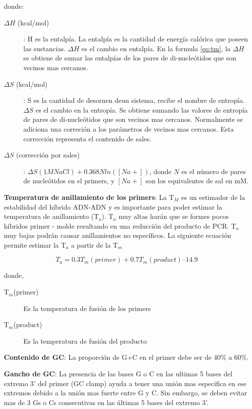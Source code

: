 \documentclass[letter,11pt]{book}
\begin{document}
donde:

\begin{description}
\item[$\Delta H$ (kcal/mol)]: H es la entalpía. La entalpía es la cantidad de energía calórica que poseen las sustancias. $\Delta H$ es el cambio en entalpía. En la formula \ref{eq:tm}, la $\Delta H$ se obtiene de sumar las entalpías de los pares de di-nucleótidos que son vecinos mas cercanos.
\item[$\Delta S$ (kcal/mol)]: S es la cantidad de desornen deun sistema, recibe el nombre de entropía. $\Delta S$ es el cambio en la entropía. Se obtiene sumando las valores de entropía de pares de di-nucleótidos que son vecinos mas cercanos. Normalmente se adiciona una correción a los parámetros de vecinos mas cercanos. Esta corrección representa el contenido de sales.
\item[$\Delta S$ (corrección por sales)]: $ \Delta S (1M NaCl )+ 0.368  N  ln([Na+]) $, donde $N$ es el número de pares de nucleótidos en el primers, y $[Na+]$ son los equivalentes de sal en mM.
\end{description}

\textbf{Temperatura de anillamiento de los primers}: La T$_M$ es un estimador de la estabilidad del híbrido ADN-ADN y es importante para poder estimar la temperatura de anillamiento (T$_a$).  T$_a$ muy altas harán que se formes pocos híbridos primer - molde resultando en una reducción del producto de PCR.  T$_a$ muy bajas podrán causar anillamientos no específicos. La siguiente ecuación permite estimar la T$_a$ a partir de la T$_m$

\begin{equation}
T_a = 0.3  T_m(primer) + 0.7 T_m (product) – 14.9
\end{equation}

donde,

\begin{description}
\item[T$_m$(primer)]  Es la temperatura de fusión de los primers
\item[T$_m$(product)] Es la temperatura de fusión del producto
\end{description}

\textbf{Contenido de GC}: La proporción de G$+$C en el primer debe ser de 40\% a 60\%.

\textbf{Gancho de GC}: La presencia de las bases G o C en las ultimas 5 bases del extremo 3' del primer (GC clamp) ayuda a tener una unión mas especifica en ese extremos debido a la unión mas fuerte entre G  y C. Sin embargo, se deben evitar mas de 3 Gs o Cs consecutivas en las últimas 5 bases del extremo 3'.
\end{document}
